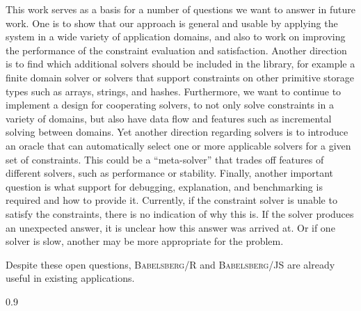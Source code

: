 \documentclass[english, inproceedings]{polze}
\newcommand{\toolname}{\textsc{Babelsberg/R}\xspace}
\newcommand{\jstoolname}{\textsc{Babelsberg/JS}\xspace}
\begin{document}
This work serves as a basis for a number of questions we want to
answer in future work.  One is to show that our approach is general
and usable by applying the system in a wide variety of application
domains, and also to work on improving the performance of the
constraint evaluation and satisfaction.  Another direction is to find
which additional solvers should be included in the library, for
example a finite domain solver or solvers that support constraints on
other primitive storage types such as arrays, strings, and
hashes. Furthermore, we want to continue to implement a design for
cooperating solvers, to not only solve constraints in a variety of
domains, but also have data flow and features such as incremental
solving between domains.  Yet another direction regarding solvers is
to introduce an oracle that can automatically select one or more
applicable solvers for a given set of constraints. This could be a
``meta-solver'' that trades off features of different solvers, such as
performance or stability. Finally, another important question is what
support for debugging, explanation, and benchmarking is required and
how to provide it.  Currently, if the constraint solver is unable to
satisfy the constraints, there is no indication of why this is. If the
solver produces an unexpected answer, it is unclear how this answer
was arrived at. Or if one solver is slow, another may be more
appropriate for the problem.

Despite these open questions, \toolname and \jstoolname are already
useful in existing applications.

\begin{spacing}{0.9}
\small
\setlength{\bibsep}{0.15cm}
  
\end{spacing}
\end{document}
